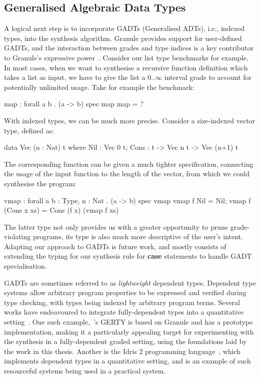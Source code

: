 \subsection{Generalised Algebraic Data Types}
A logical next step is to incorporate GADTs (Generalised ADTs), i.e., indexed
types,  into the synthesis algorithm. Granule provides support for user-defined
GADTs, and the interaction between grades and type indices is a key contributor
to Granule's expressive power~\citep{DBLP:journals/pacmpl/OrchardLE19}. Consider
our list type benchmarks for example. In most cases, when we want to synthesise
a recursive function definition which takes a list as input, we have to give the
list a $0..\infty$ interval grade to account for potentially unlimited usage.
Take for example the  benchmark:
\begin{granule}
map : forall a b . (a -> b) %
spec
    map %
map = ?
\end{granule}
With indexed types, we can be much more precise. Consider a size-indexed vector type,
defined as:
\begin{granule}
data Vec (n : Nat) t where
  Nil  : Vec 0 t;
  Cons : t -> Vec n t -> Vec (n+1) t
\end{granule}
%
The corresponding  function
can be given a much tighter specification, connecting the usage of the
input function to the length of the vector, from which we could
synthesise the program:
\begin{granule}
vmap : forall {a b : Type, n : Nat} . (a -> b) %
spec
    vmap %
vmap f Nil = Nil;
vmap f (Cons x xs) = Cons (f x) (vmap f xs)
\end{granule}
The latter type not only provides us with a greater opportunity to prune
grade-violating programs, its type is also much more descriptive of the user's
intent. Adapting our approach to GADTs is future work, and mostly consists of
extending the typing for our synthesis rule for \textbf{case} statements to
handle GADT specialisation.

GADTs are sometimes referred to as \emph{lightweight} dependent types. Dependent
type systems allow arbitrary program properties to be expressed and verified
during type checking, with types being indexed by arbitrary program terms.
Several works have endeavoured to integrate fully-dependent types into a
quantitative setting~\citep{DBLP:journals/pacmpl/ChoudhuryEEW21,
10.1145/3607862, McBride2016, 10.1145/2676726.2676969}. One such
example,~\citet{DBLP:conf/esop/MoonEO21}'s \textsc{GERTY} is based on Granule
and has a prototype implementation, making it a particularly appealing target
for experimenting with the synthesis in a fully-dependent graded setting, using
the foundations laid by the work in this thesis. Another is the Idris 2
programming language~\citep{DBLP:journals/corr/abs-2104-00480}, which implements
dependent types in a quantitative setting, and is an example of such resourceful
systems being used in a practical system.


